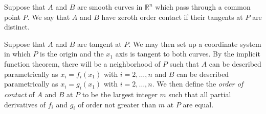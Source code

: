 \documentclass[12pt]{article}
\begin{document}
Suppose that $A$ and $B$ are smooth curves in $\mathbb{R}^n$ which pass through 
a common point $P$.  We say that $A$ and $B$ have zeroth order contact if their
tangents at $P$ are distinct.

Suppose that $A$ and $B$ are tangent at $P$.  We may then set up a coordinate
system in which $P$ is the origin and the $x_1$ axis is tangent to both curves.
By the implicit function theorem, there will be a neighborhood of $P$ such that
$A$ can be described parametrically as $x_i = f_i (x_1)$ with $i = 2, \ldots, n$
and $B$ can be described parametrically as $x_i = g_i (x_1)$ with 
$i = 2, \ldots, n$.  We then define the \emph{order of contact} of $A$ and $B$ 
at $P$ to be the largest integer $m$ such that all partial derivatives of $f_i$ 
and $g_i$ of order not greater than $m$ at $P$ are equal.

\end{document}
